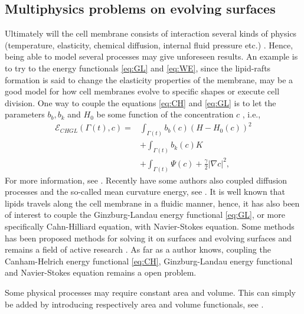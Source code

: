 \subsection{Multiphysics problems on evolving surfaces}%

Ultimately will the cell membrane consists of interaction several kinds of physics (temperature, elasticity, chemical diffusion, internal fluid pressure etc.) \cite{udo97}. Hence, being able to model several processes may give unforeseen results. An example is to try to the
energy functionals \eqref{eq:GL}  and \eqref{eq:WE}, since the lipid-rafts formation is said to change the elasticity properties of the membrane, may be a good model for how cell membranes evolve to specific shapes or execute cell division. One way
to couple the equations \eqref{eq:CH} and \eqref{eq:GL} is to let the parameters $b_{b}, b_{k}$ and $ H_{0} $ be some function of the concentration $c$ , i.e.,
\[
    \begin{split}
        \mathcal{E}_{CHGL} \left( \Gamma\left( t \right) ,c   \right) =  & \int_{\Gamma\left( t \right)  }^{}  b_{b}\left( c \right)  \left( H- H_{0}\left( c \right)  \right) ^{2}  \\
        & + \int_{\Gamma\left(t  \right)   }^{} b_{k}\left( c \right)  K \\
        &+ \int_{\Gamma\left(t  \right)   }^{}\Psi \left( c \right) + \frac{\gamma}{2} \left\lvert \nabla c \right\rvert^{2} ,
    \end{split}
\]
For more information, see \cite{elliott2010surface}. Recently have some authors also coupled diffusion processes and the so-called mean curvature energy, see \cite{burger2021interaction, elliott2022numerical}. It is well known that lipids travels
along the cell membrane in a fluidic manner, hence, it has also been of interest to couple the Ginzburg-Landau energy functional \eqref{eq:GL}, or more specifically Cahn-Hilliard equation, with Navier-Stokes equation. Some methods has been proposed methods for solving it on surfaces
and evolving surfaces and remains a field of active research \cite{olshanskii2022comparison}. As far as a author knows, coupling the Canham-Helrich energy functional \eqref{eq:CH}, Ginzburg-Landau energy functional and Navier-Stokes equation remains a open problem.

Some physical processes may require constant area and volume. This can simply be added by introducing respectively area and volume functionals, see \cite[Definition 2.5]{muller2013volume}.

